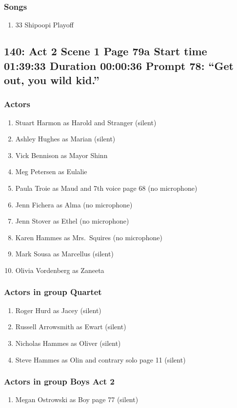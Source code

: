 \subsubsection{Songs}
\begin{enumerate}
\item 33 Shipoopi Playoff
\end{enumerate}
\subsection{140: Act 2 Scene 1 Page 79a Start time 01:39:33 Duration 00:00:36 Prompt 78: ``Get out, you wild kid.''}

\subsubsection{Actors}
\begin{enumerate}
\item Stuart Harmon as Harold and Stranger (silent)
\item Ashley Hughes as Marian (silent)
\item Vick Bennison as Mayor Shinn
\item Meg Petersen as Eulalie
\item Paula Troie as Maud and 7th voice page 68 (no microphone)
\item Jenn Fichera as Alma (no microphone)
\item Jenn Stover as Ethel (no microphone)
\item Karen Hammes as Mrs.~Squires (no microphone)
\item Mark Sousa as Marcellus (silent)
\item Olivia Vordenberg as Zaneeta
\end{enumerate}
\subsubsection{Actors in group Quartet}
\begin{enumerate}
\item Roger Hurd as Jacey (silent)
\item Russell Arrowsmith as Ewart (silent)
\item Nicholas Hammes as Oliver (silent)
\item Steve Hammes as Olin and contrary solo page 11 (silent)
\end{enumerate}
\subsubsection{Actors in group Boys Act 2}
\begin{enumerate}
\item Megan Ostrowski as Boy page 77 (silent)
\end{enumerate}


